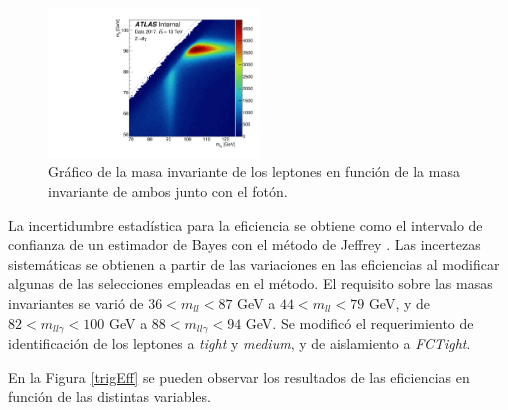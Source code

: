 \begin{figure}
\centering

  \includegraphics[width=0.5\textwidth]{images/h_mllg_mll.pdf}
	\caption{Gráfico de la masa invariante de los leptones en función de la masa invariante de ambos junto con el fotón. 
\commentNotaIII 
}

  \label{mllgmll}
\end{figure}

La incertidumbre estadística para la eficiencia se obtiene como el intervalo de confianza de un estimador de Bayes con el método de Jeffrey \cite{jeffrey} 
. Las incertezas sistemáticas se obtienen a partir de las variaciones en las eficiencias al modificar algunas de las selecciones empleadas en el método. El requisito sobre las masas invariantes se varió de $36<m_{ll}<87$ GeV a $44<m_{ll}<79$ GeV, y de 
$82<m_{ll\gamma}<100$ GeV a $88<m_{ll\gamma}<94$ GeV. Se modificó el requerimiento de identificación de los leptones a \textit{tight} y \textit{medium}, y de aislamiento a \textit{FCTight}. 

En la Figura \ref{trigEff} se pueden observar los resultados de las eficiencias en función de las distintas variables. 



